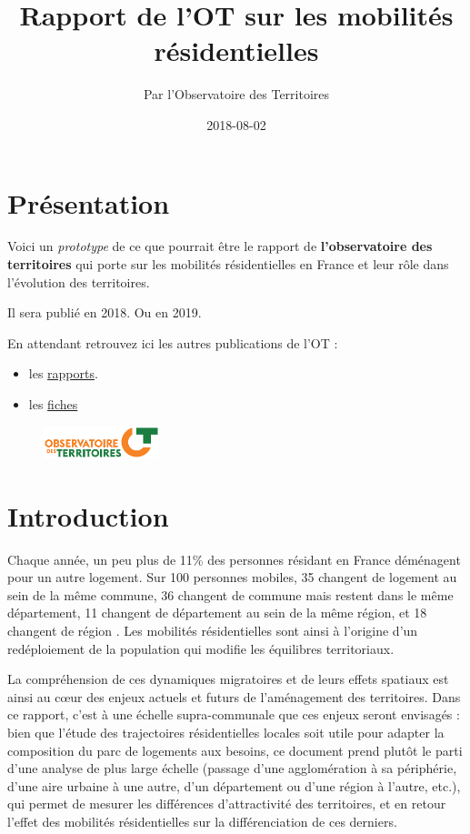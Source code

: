 \documentclass[]{book}
\title{Rapport de l'OT sur les mobilités résidentielles}
\author{Par l'Observatoire des Territoires}
\date{2018-08-02}
\begin{document}
\maketitle

{
\setcounter{tocdepth}{1}
\tableofcontents
}
\chapter{Présentation}\label{presentation}

Voici un \emph{prototype} de ce que pourrait être le rapport de
\textbf{l'observatoire des territoires} qui porte sur les mobilités
résidentielles en France et leur rôle dans l'évolution des territoires.

Il sera publié en 2018. Ou en 2019.

En attendant retrouvez ici les autres publications de l'OT :

\begin{itemize}
\item
  les
  \href{http://www.observatoire-des-territoires.gouv.fr/observatoire-des-territoires/fr/rapports/}{rapports}.
\item
  les
  \href{http://www.observatoire-des-territoires.gouv.fr/observatoire-des-territoires/fr/fiches-danalyse/}{fiches}
\end{itemize}

\begin{figure}
\centering
\includegraphics[width=0.30000\textwidth]{./img/logo_OT.png}
\caption{}
\end{figure}

\chapter{Introduction}\label{intro}

Chaque année, un peu plus de 11\% des personnes résidant en France
déménagent pour un autre logement. Sur 100 personnes mobiles, 35
changent de logement au sein de la même commune, 36 changent de commune
mais restent dans le même département, 11 changent de département au
sein de la même région, et 18 changent de région . Les mobilités
résidentielles sont ainsi à l'origine d'un redéploiement de la
population qui modifie les équilibres territoriaux.

La compréhension de ces dynamiques migratoires et de leurs effets
spatiaux est ainsi au cœur des enjeux actuels et futurs de l'aménagement
des territoires. Dans ce rapport, c'est à une échelle supra-communale
que ces enjeux seront envisagés : bien que l'étude des trajectoires
résidentielles locales soit utile pour adapter la composition du parc de
logements aux besoins, ce document prend plutôt le parti d'une analyse
de plus large échelle (passage d'une agglomération à sa périphérie,
d'une aire urbaine à une autre, d'un département ou d'une région à
l'autre, etc.), qui permet de mesurer les différences d'attractivité des
territoires, et en retour l'effet des mobilités résidentielles sur la
différenciation de ces derniers.
\end{document}
